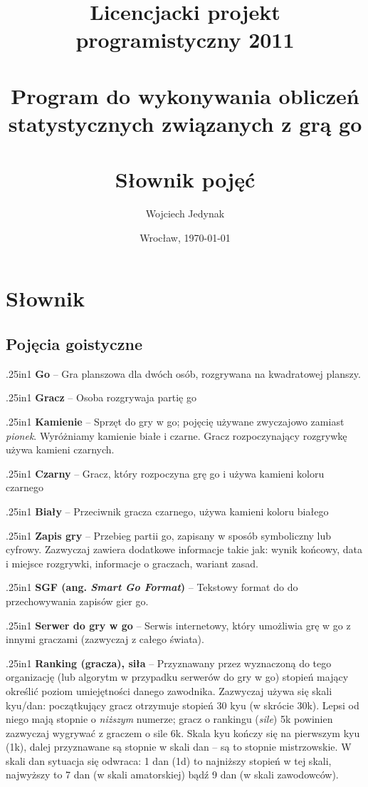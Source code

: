 \documentclass[12pt,leqno]{article}
\title{\LARGE Licencjacki projekt programistyczny 2011 \\ 
       \ \\
       Program do wykonywania obliczeń statystycznych związanych z grą go \\ 
       \ \\
       Słownik pojęć }
\author{Wojciech Jedynak}
\date{Wrocław, \today}
\newcommand{\entry}[2]{
 \begin{hangparas}{.25in}{1}
  \noindent \textbf{#1} -- #2 \\
 \end{hangparas}
}
\begin{document}
\maketitle 

\thispagestyle{empty}

\newpage

\section{Słownik}

\subsection{Pojęcia goistyczne}

\entry{Go}{Gra planszowa dla dwóch osób, rozgrywana na kwadratowej planszy.}

\entry{Gracz}{Osoba rozgrywaja partię go}

\entry{Kamienie}{Sprzęt do gry w go; pojęcię używane zwyczajowo zamiast \emph{pionek}. Wyróżniamy kamienie
 białe i czarne. Gracz rozpoczynający rozgrywkę używa kamieni czarnych.}

\entry{Czarny}{Gracz, który rozpoczyna grę go i używa kamieni koloru czarnego}

\entry{Biały}{Przeciwnik gracza czarnego, używa kamieni koloru białego}

\entry{Zapis gry}{Przebieg partii go, zapisany w sposób symboliczny lub cyfrowy. Zazwyczaj zawiera
  dodatkowe informacje takie jak: wynik końcowy, data i miejsce rozgrywki, informacje o graczach, wariant zasad.}

\entry{SGF (ang. \emph{Smart Go Format})}{Tekstowy format do do przechowywania zapisów gier go.}

\entry{Serwer do gry w go}{Serwis internetowy, który umożliwia grę w go z innymi graczami (zazwyczaj z całego świata).}

\entry{Ranking (gracza), siła}{Przyznawany przez wyznaczoną do tego organizację (lub algorytm w przypadku serwerów do gry w go)
  stopień mający określić poziom umiejętności danego zawodnika. Zazwyczaj używa się skali kyu/dan: początkujący gracz
  otrzymuje stopień 30 kyu (w skrócie 30k). Lepsi od niego mają stopnie o \emph{niższym} numerze; gracz o rankingu (\emph{sile})
  5k powinien zazwyczaj wygrywać z graczem o sile 6k. Skala kyu kończy się na pierwszym kyu (1k), dalej przyznawane są stopnie
  w skali dan -- są to stopnie mistrzowskie. W skali dan sytuacja się odwraca: 1 dan (1d) to najniższy stopień w tej skali,
  najwyższy to 7 dan (w skali amatorskiej) bądź 9 dan (w skali zawodowców).}
\end{document}
